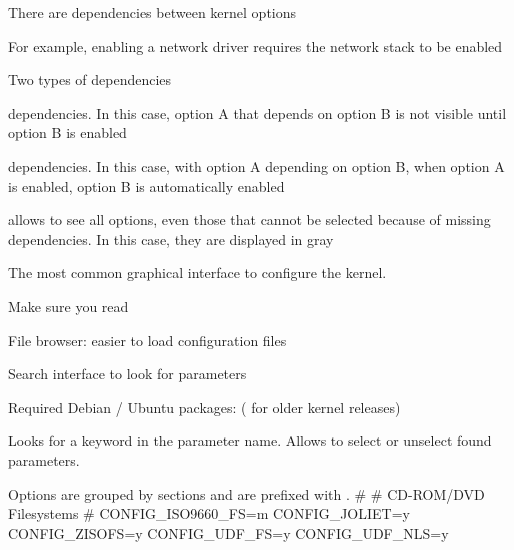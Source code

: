   \startitemize
  \item There are dependencies between kernel options
  \item For example, enabling a network driver requires the network
    stack to be enabled
  \item Two types of dependencies
    \startitemize
    \item {} dependencies. In this case, option A that
      depends on option B is not visible until option B is enabled
    \item {} dependencies. In this case, with option A
      depending on option B, when option A is enabled, option B is
      automatically enabled
    \item {} allows to see all options, even those
      that cannot be selected because of missing dependencies. In this
      case, they are displayed in gray
    \stopitemize
  \stopitemize

  \startitemize
  \item The most common graphical interface to configure the kernel.
  \item Make sure you read\\
  \item File browser: easier to load configuration files
  \item Search interface to look for parameters
  \item Required Debian / Ubuntu packages:  
    ( for older kernel releases)
  \stopitemize



  Looks for a keyword in the parameter name. Allows to select or
  unselect found parameters.



  Options are grouped by sections and are prefixed with
  .
\starttyping
#
# CD-ROM/DVD Filesystems
#
CONFIG_ISO9660_FS=m
CONFIG_JOLIET=y
CONFIG_ZISOFS=y
CONFIG_UDF_FS=y
CONFIG_UDF_NLS=y

